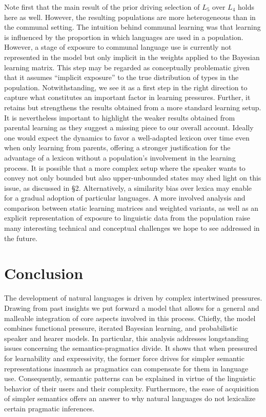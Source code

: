 \documentclass[10pt,a4paper]{article}
\begin{document}
Note first that the main result of the prior driving selection of $L_5$ over $L_4$ holds here as well. However, the resulting populations are more heterogeneous than in the communal setting.  The intuition behind communal learning was that learning is influenced by the proportion in which languages are used in a population. However, a stage of exposure to communal language use is currently not represented in the model but only implicit in the weights applied to the Bayesian learning matrix. This step may be regarded as conceptually problematic given that it assumes ``implicit exposure'' to the true distribution of types in the population. Notwithstanding, we see it as a first step in the right direction to capture what constitutes an important factor in learning pressures. Further, it retains but strengthens the results obtained from a more standard learning setup. It is nevertheless important to highlight the weaker results obtained from parental learning as they suggest a missing piece to our overall account. Ideally one would expect the dynamics to favor a well-adapted lexicon over time even when only learning from parents, offering a stronger justification for the advantage of a lexicon without a population's involvement in the learning process. It is possible that a more complex setup where the speaker wants to convey not only bounded but also upper-unbounded states may shed light on this issue, as discussed in \S 2. Alternatively, a similarity bias over lexica may enable for a gradual adoption of particular languages.  A more involved analysis and comparison between static learning matrices and weighted variants, as well as an explicit representation of exposure to linguistic data from the population raise many interesting technical and conceptual challenges we hope to see addressed in the future.






\section{Conclusion}
The development of natural languages is driven by complex intertwined pressures. Drawing from past insights we put forward a model that allows for a general and malleable integration of core aspects involved in this process. Chiefly, the model combines functional pressure, iterated Bayesian learning, and probabilistic speaker and hearer models.  In particular, this analysis addresses longstanding issues concerning the semantics-pragmatics divide. It shows that when pressured for learnability and expressivity, the former force drives for simpler semantic representations inasmuch as pragmatics can compensate for them in language use. Consequently, semantic patterns can be explained in virtue of the linguistic behavior of their users and their complexity. Furthermore, the ease of acquisition of simpler semantics offers an answer to why natural languages do not lexicalize certain pragmatic inferences.
\end{document}
